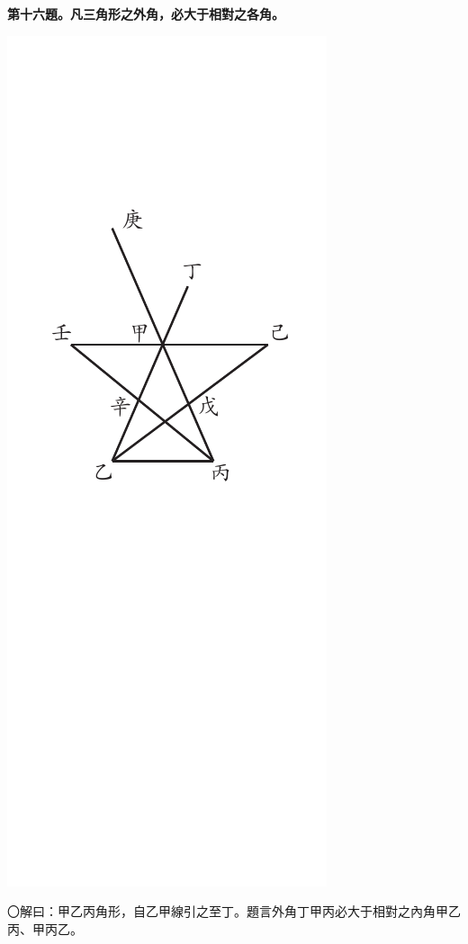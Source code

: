 \documentclass[12pt,b5paper,landscape]{article}
\newcommand{\bcom}[1]{〇#1}
\newcommand{\cthm}[1]{{
\vspace{8pt}

\bfseries #1}}
\begin{document}
\begin{multicols}{2}
\cthm{第十六題。凡三角形之外角，必大于相對之各角。}
\begin{center}
  \includegraphics[angle=90]{eu61}
\end{center}
\bcom{解曰：甲乙丙角形，自乙甲線引之至丁。題言外角丁甲丙必大于相對之內角甲乙丙、甲丙乙。}

\end{multicols}
\end{document}
